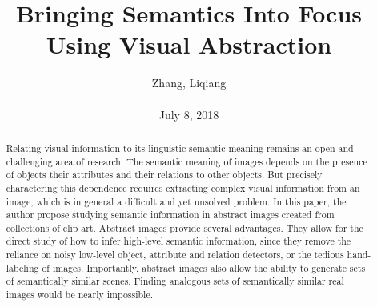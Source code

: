 \documentclass[10pt,twocolumn,letterpaper]{article}
\title{\textbf{Bringing Semantics Into Focus Using Visual Abstraction}}
\author{Zhang, Liqiang\\\\July 8, 2018}
\begin{document}
\maketitle
\par
\begin{abstract}
Relating visual information to its linguistic semantic meaning remains an open and challenging area of research. The semantic meaning of images depends on the presence of objects their attributes and their relations to other objects. But precisely charactering this dependence requires extracting complex visual information from an image, which is in general a difficult and yet unsolved problem. In this paper, the author propose studying semantic information in abstract images created from collections of clip art. Abstract images provide several advantages. They allow for the direct study of how to infer high-level semantic information, since they remove the reliance on noisy low-level object, attribute and relation detectors, or the tedious hand-labeling of images. Importantly, abstract images also allow the ability to generate sets of semantically similar scenes. Finding analogous sets of semantically similar real images would be nearly impossible. 
\end{abstract}
\end{document}
